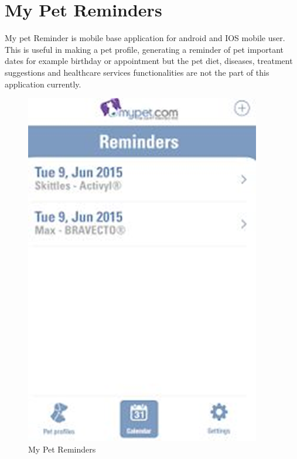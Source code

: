 \section{My Pet Reminders\cite{capseven}}
My pet Reminder is mobile base application for android and IOS mobile user. This is useful in making a pet profile, generating a reminder of pet important dates for example birthday or appointment but the pet diet, diseases, treatment suggestions and healthcare services functionalities are not the part of this application currently.
\begin{figure}[H]
  \centering
    \includegraphics[scale=0.3]{22MyPetRemainder}
     \caption{My Pet Reminders}
\end{figure}
